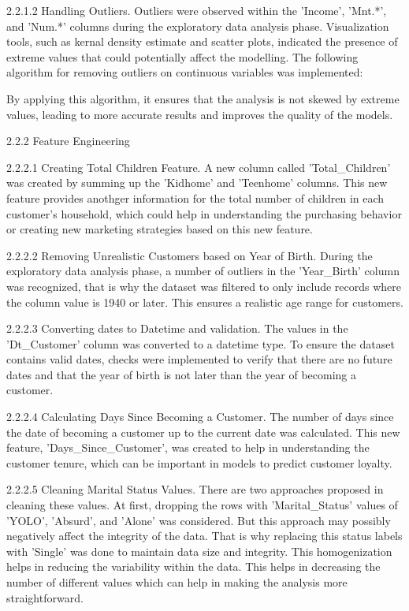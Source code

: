     2.2.1.2 Handling Outliers. Outliers were observed within the 'Income', 'Mnt.*', and 'Num.*' columns during the exploratory data analysis phase. Visualization tools, such as kernal density estimate and scatter plots, indicated the presence of extreme values that could potentially affect the modelling. The following algorithm for removing outliers on continuous variables was implemented:


    By applying this algorithm, it ensures that the analysis is not skewed by extreme values, leading to more accurate results and improves the quality of the models.

2.2.2 Feature Engineering

    2.2.2.1 Creating Total Children Feature. A new column called 'Total_Children' was created by summing up the 'Kidhome' and 'Teenhome' columns. This new feature provides anothger information for the total number of children in each customer's household, which could help in understanding the purchasing behavior or creating new marketing strategies based on this new feature.

    2.2.2.2 Removing Unrealistic Customers based on Year of Birth. During the exploratory data analysis phase, a number of outliers in the 'Year_Birth' column was recognized, that is why the dataset was filtered to only include records where the column value is 1940 or later. This ensures a realistic age range for customers.

    2.2.2.3 Converting dates to Datetime and validation. The values in the 'Dt_Customer' column was converted to a datetime type. To ensure the dataset contains valid dates, checks were implemented to verify that there are no future dates and that the year of birth is not later than the year of becoming a customer.

    2.2.2.4 Calculating Days Since Becoming a Customer. The number of days since the date of becoming a customer up to the current date was calculated. This new feature, 'Days_Since_Customer', was created to help in understanding the customer tenure, which can be important in models to predict customer loyalty.

    2.2.2.5 Cleaning Marital Status Values. There are two approaches proposed in cleaning these values. At first, dropping the rows with 'Marital_Status' values of 'YOLO', 'Absurd', and 'Alone' was considered. But this approach may possibly negatively affect the integrity of the data. That is why replacing this status labels with 'Single' was done to maintain data size and integrity. This homogenization helps in reducing the variability within the data. This helps in decreasing the number of different values which can help in making the analysis more straightforward.

